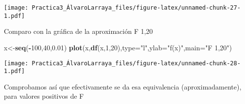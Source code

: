 \documentclass[
]{article}
\newenvironment{Shaded}{\begin{snugshade}}{\end{snugshade}}
\newcommand{\DataTypeTok}[1]{\textcolor[rgb]{0.13,0.29,0.53}{#1}}
\newcommand{\DecValTok}[1]{\textcolor[rgb]{0.00,0.00,0.81}{#1}}
\newcommand{\FloatTok}[1]{\textcolor[rgb]{0.00,0.00,0.81}{#1}}
\newcommand{\KeywordTok}[1]{\textcolor[rgb]{0.13,0.29,0.53}{\textbf{#1}}}
\newcommand{\NormalTok}[1]{#1}
\newcommand{\OperatorTok}[1]{\textcolor[rgb]{0.81,0.36,0.00}{\textbf{#1}}}
\newcommand{\StringTok}[1]{\textcolor[rgb]{0.31,0.60,0.02}{#1}}
\begin{document}
\texttt{[image: Practica3\_ÁlvaroLarraya\_files/figure-latex/unnamed-chunk-27-1.pdf]}

Comparo con la gráfica de la aproximación F 1,20

\begin{Shaded}
\begin{Highlighting}[]
\NormalTok{x<-}\KeywordTok{seq}\NormalTok{(}\OperatorTok{-}\DecValTok{100}\NormalTok{,}\DecValTok{40}\NormalTok{,}\FloatTok{0.01}\NormalTok{)}
\KeywordTok{plot}\NormalTok{(x,}\KeywordTok{df}\NormalTok{(x,}\DecValTok{1}\NormalTok{,}\DecValTok{20}\NormalTok{),}\DataTypeTok{type=}\StringTok{"l"}\NormalTok{,}\DataTypeTok{ylab=}\StringTok{"f(x)"}\NormalTok{,}\DataTypeTok{main=}\StringTok{"F 1,20"}\NormalTok{)}
\end{Highlighting}
\end{Shaded}

\texttt{[image: Practica3\_ÁlvaroLarraya\_files/figure-latex/unnamed-chunk-28-1.pdf]}

Comprobamos así que efectivamente se da esa equivalencia
(aproximadamente), para valores positivos de F
\end{document}
